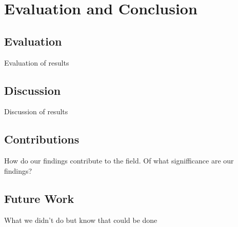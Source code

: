 \chapter{Evaluation and Conclusion}

\section{Evaluation}
Evaluation of results

\section{Discussion}
Discussion of results

\section{Contributions}
How do our findings contribute to the field. Of what signifficance are our findings?

\section{Future Work}
What we didn't do but know that could be done

\cleardoublepage